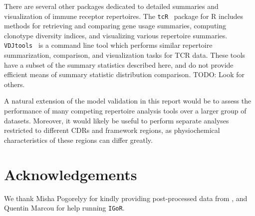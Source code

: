 \documentclass{article}
\newcommand{\igor}{\texttt{IGoR}}
\newcommand{\beginsupplement}{%
        \setcounter{table}{0}
        \renewcommand{\thetable}{S\arabic{table}}%
        \setcounter{figure}{0}
        \renewcommand{\thefigure}{S\arabic{figure}}%
     }
\begin{document}
There are several other packages dedicated to detailed summaries and visualization of immune receptor repertoires.
The \texttt{tcR}~\cite{Nazarov2015-ok} package for R includes methods for retrieving and comparing gene usage summaries, computing clonotype diversity indices, and visualizing various repertoire summaries.
\texttt{VDJtools}~\cite{Shugay2015-ur} is a command line tool which performs similar repertoire summarization, comparison, and visualization tasks for TCR data.
These tools have a subset of the summary statistics described here, and do not provide efficient means of summary statistic distribution comparison.
TODO: Look for others.

A natural extension of the model validation in this report would be to assess the performance of many competing repertoire analysis tools over a larger group of datasets.
Moreover, it would likely be useful to perform separate analyses restricted to different CDRs and framework regions, as physiochemical characteristics of these regions can differ greatly.



\section*{Acknowledgements}
We thank Misha Pogorelyy for kindly providing post-processed data from \cite{Pogorelyy2018-ak}, and Quentin Marcou for help running \igor.





\beginsupplement
\end{document}
